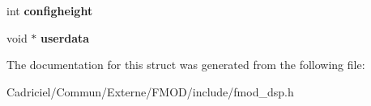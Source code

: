 \begin{DoxyCompactItemize}
\item 
int {\bfseries configheight}\hypertarget{struct_f_m_o_d___d_s_p___d_e_s_c_r_i_p_t_i_o_n_a896589017397442724a4e26a6aa2d921}{}\label{struct_f_m_o_d___d_s_p___d_e_s_c_r_i_p_t_i_o_n_a896589017397442724a4e26a6aa2d921}

\item 
void $\ast$ {\bfseries userdata}\hypertarget{struct_f_m_o_d___d_s_p___d_e_s_c_r_i_p_t_i_o_n_a1610f0c65c07582271120060e36e9d87}{}\label{struct_f_m_o_d___d_s_p___d_e_s_c_r_i_p_t_i_o_n_a1610f0c65c07582271120060e36e9d87}

\end{DoxyCompactItemize}


The documentation for this struct was generated from the following file\+:\begin{DoxyCompactItemize}
\item 
Cadriciel/\+Commun/\+Externe/\+F\+M\+O\+D/include/fmod\+\_\+dsp.\+h\end{DoxyCompactItemize}
